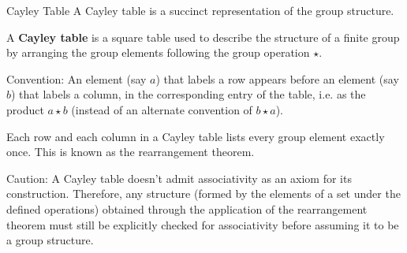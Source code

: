 \documentclass{beamer}
\newcommand\boldtext[1]{\textcolor{bolds}{\textbf{#1}}}
\begin{document}
\begin{frame}{Cayley Table}
    A Cayley table is a succinct representation of the group structure.
    \begin{definition}
        A \boldtext{Cayley table} is a square table used to describe the structure of a finite group by arranging the group elements following the group operation $\star$.
    \end{definition}
    Convention: An element (say $a$) that labels a row appears before an element (say $b$) that labels a column, in the corresponding entry of the table, i.e. as the product $a\star b$ (instead of an alternate convention of $b\star a$).
    \begin{theorem}
        Each row and each column in a Cayley table lists every group element exactly once. This is known as the rearrangement theorem.
    \end{theorem}
    Caution: A Cayley table doesn't admit associativity as an axiom for its construction. Therefore, any structure (formed by the elements of a set under the defined operations) obtained through the application of the rearrangement theorem must still be explicitly checked for associativity before assuming it to be a group structure.
\end{frame}
\end{document}
